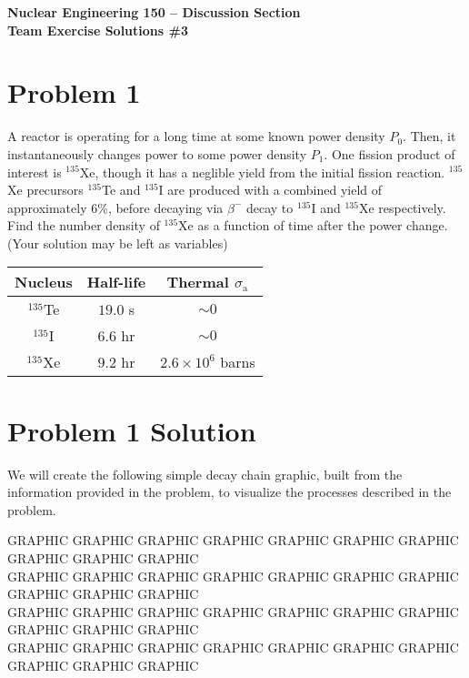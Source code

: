 \documentclass{report}
\begin{document}
\begin{center}
\textbf{\large Nuclear Engineering 150 -- Discussion Section}\\ 
\textbf{Team Exercise Solutions \#3}
\end{center}

\section*{Problem 1}

A reactor is operating for a long time at some known power density $P_0$. Then, it instantaneously changes power to some power density $P_1$. One fission product of interest is $^{135}$Xe, though it has a neglible yield from the initial fission reaction. $^{135}$Xe precursors $^{135}$Te and $^{135}$I are produced with a combined yield of approximately 6\%, before decaying via $\beta^{-}$ decay to $^{135}$I and $^{135}$Xe respectively. Find the number density of $^{135}$Xe as a function of time after the power change. (Your solution may be left as variables)

\begin{table}[htbp]
	\centering
	\begin{tabular}{|c|c|c|}
			\hline
			Nucleus		&	Half-life 	& Thermal $\sigma_{\text{a}}$ \\
			\hline
			$^{135}$Te	&  $19.0$ s 	& $\sim 0$\\
			$^{135}$I	&  $6.6$ hr 	& $\sim 0$\\
			$^{135}$Xe	&  $9.2$ hr 	& $2.6 \times 10^6$ barns \\
			\hline
	\end{tabular}
	\label{tab:design-specs}
\end{table}




\section*{Problem 1 Solution}

We will create the following simple decay chain graphic, built from the information provided in the problem, to visualize the processes described in the problem.

GRAPHIC GRAPHIC GRAPHIC GRAPHIC GRAPHIC GRAPHIC GRAPHIC GRAPHIC GRAPHIC GRAPHIC \\
GRAPHIC GRAPHIC GRAPHIC GRAPHIC GRAPHIC GRAPHIC GRAPHIC GRAPHIC GRAPHIC GRAPHIC \\
GRAPHIC GRAPHIC GRAPHIC GRAPHIC GRAPHIC GRAPHIC GRAPHIC GRAPHIC GRAPHIC GRAPHIC \\
GRAPHIC GRAPHIC GRAPHIC GRAPHIC GRAPHIC GRAPHIC GRAPHIC GRAPHIC GRAPHIC GRAPHIC \\
\end{document}
